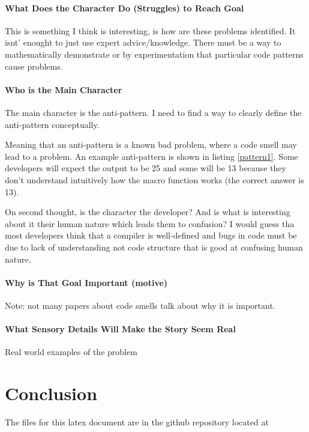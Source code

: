 \documentclass[conference]{IEEEtran}
\begin{document}
\paragraph{What Does the Character Do (Struggles) to Reach Goal}
This is something I think is interesting, is how are these problems identified.
It isnt' enought to just use expert advice/knowledge. 
There must be a way to mathematically demonstrate or by experimentation that particular code patterns cause problems.

\paragraph{Who is the Main Character}
The main character is the anti-pattern. I need to find a way to clearly define the anti-pattern conceptually. 

Meaning that an anti-pattern is a known bad problem, where a code smell may lead to a problem.
An example anti-pattern is shown in listing \ref{pattern1}. Some developers will expect the output to be 25 and some will be 13 because they don't understand intuitively how the macro function works (the correct answer is 13).

On second thought, is the character the developer? 
And is what is interesting about it their human nature which leads them to confusion?
I would guess tha most developers think that a compiler is well-defined and bugs in code must be due to lack of understanding not code structure that is good at confusing human nature.

\paragraph{Why is That Goal Important (motive)}
Note: not many papers about code smells talk about why it is important.

\paragraph{What Sensory Details Will Make the Story Seem Real}
Real world examples of the problem

\section{Conclusion}

The files for this latex document are in the github repository located at 

\nocite{*}



\end{document}
